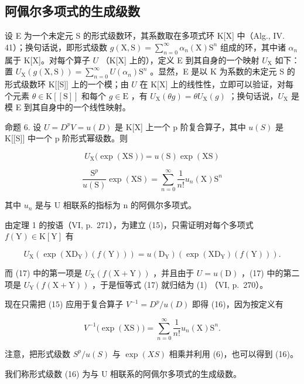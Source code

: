 \subsection{阿佩尔多项式的生成级数}

设 E 为一个未定元 S 的形式级数环，其系数取在多项式环 K{[}X{]} 中（Alg., IV. 41）；换句话说，即形式级数 \(g(\mathrm{X}, \mathrm{S}) = \sum_{n=0}^{\infty} \alpha_n(\mathrm{X}) \mathrm{S}^n\) 组成的环，其中诸 \(\alpha_n\) 属于 K{[}X{]}。对每个算子 \(U\) （K{[}X{]} 上的），定义 E 到其自身的一个映射 \(U_{\mathrm{X}}\) 如下：置 \(U_{\mathrm{X}}(g(\mathrm{X}, \mathrm{S})) = \sum_{n=0}^{\infty} U(\alpha_n)\mathrm{S}^n\) 。显然，E 是以 K 为系数的未定元 S 的形式级数环 K{[}{[}S{]}{]} 上的一个模；由 \(U\) 在 K{[}X{]} 上的线性性，立即可以验证，对每个元素 \(\theta \in \mathrm{K}[[\mathrm{S}]]\) 和每个 \(g \in \mathrm{E}\) ，有 \(U_{\mathrm{X}}(\theta g) = \theta U_{\mathrm{X}}(g)\) ；换句话说，\(U_{\mathrm{X}}\) 是模 E 到其自身中的一个线性映射。

命题 6. 设 \(U = D^{p}V = u(D)\) 是 K{[}X{]} 上一个 p 阶复合算子，其中 \(u(S)\) 是 K{[}{[}S{]}{]} 中一个 p 阶形式幂级数。则

\[
U _ {\mathrm{X}} \big (\exp (\mathrm{XS}) \big) = u (\mathrm{S}) \exp (\mathrm{XS})\tag{15}
\]

\[
\frac {\mathrm{S} ^ {p}}{u (\mathrm{S})} \exp (\mathrm{XS}) = \sum_ {n = 0} ^ {\infty} \frac {1}{n !} u _ {n} (\mathrm{X}) \mathrm{S} ^ {n}\tag{16}
\]

其中 \(u_{n}\) 是与 U 相联系的指标为 n 的阿佩尔多项式。

由定理 1 的按语（VI, p.~271），为建立 (15)，只需证明对每个多项式 \(f(\mathrm{Y}) \in \mathrm{K}[\mathrm{Y}]\) 有

\[
U _ {\mathrm{X}} \left(\exp (\mathrm{XD} _ {\mathrm{Y}}) (f (\mathrm{Y}))\right) = u (\mathrm{D} _ {\mathrm{Y}}) \left(\exp (\mathrm{XD} _ {\mathrm{Y}}) (f (\mathrm{Y}))\right).\tag{17}
\]

而 (17) 中的第一项是 \(U_{\mathrm{X}}(f(\mathrm{X} + \mathrm{Y}))\) ，并且由于 \(U = u(\mathrm{D})\) ，(17) 中的第二项是 \(U_{\mathrm{Y}}(f(\mathrm{X} + \mathrm{Y}))\) ，于是恒等式 (17) 就归结为 (1) （VI, p.~270）。

现在只需把 (15) 应用于复合算子 \(V^{-1} = D^{p}/u(D)\) 即得 (16)，因为按定义有

\[
V ^ {- 1} \big (\exp (\mathrm{XS}) \big) = \sum_ {n = 0} ^ {\infty} \frac {1}{n !} u _ {n} (\mathrm{X}) \mathrm{S} ^ {n}.
\]

注意，把形式级数 \(S^{p}/u(S)\) 与 \(\exp(XS)\) 相乘并利用 (6)，也可以得到 (16)。

我们称形式级数 (16) 为与 U 相联系的阿佩尔多项式的生成级数。

